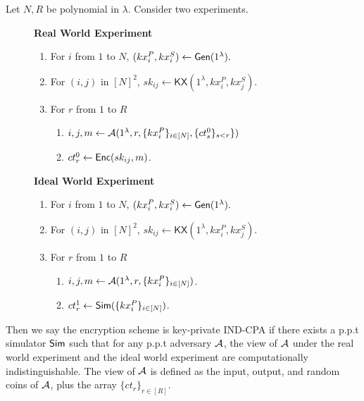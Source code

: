 \begin{definition}
Let $N, R$ be polynomial in $\lambda$. Consider two experiments.
\begin{figure}[h!]
\begin{framed}
\textbf{Real World Experiment}
\begin{enumerate}
    \item For $i$ from $1$ to $N$, $(kx_i^P, kx_i^S) \leftarrow \mathsf{Gen}(1^{\lambda}).$
    \item For $(i, j)$ in $[N]^2$, $sk_{ij} \leftarrow \mathsf{KX}(1^{\lambda}, kx_i^P, kx_j^S)$.
    \item For $r$ from $1$ to $R$
    \begin{enumerate}
        \item $i, j, m \leftarrow \mathcal{A}(1^{\lambda}, r, \{kx_i^P\}_{i \in [N]}, \{ct_{s}^0\}_{s < r}\})$
        \item $ct^{0}_r \leftarrow \mathsf{Enc}(sk_{ij}, m)$.
    \end{enumerate}
\end{enumerate}
\textbf{Ideal World Experiment}
\begin{enumerate}
    \item For $i$ from $1$ to $N$, $(kx_i^P, kx_i^S) \leftarrow \mathsf{Gen}(1^{\lambda}).$
    \item For $(i, j)$ in $[N]^2$, $sk_{ij} \leftarrow \mathsf{KX}(1^{\lambda}, kx_i^P, kx_j^S)$.
    \item For $r$ from $1$ to $R$
    \begin{enumerate}
        \item $i, j, m \leftarrow \mathcal{A}(1^{\lambda}, r, \{kx_i^P\}_{i \in [N]})$.
        \item $ct^1_r \leftarrow \mathsf{Sim}(\{kx_i^P\}_{i \in [N]})$.
    \end{enumerate}
\end{enumerate}
\end{framed}
\end{figure}
Then we say the encryption scheme is key-private IND-CPA if there exists a p.p.t simulator $\mathsf{Sim}$ such that for any p.p.t adversary $\mathcal{A}$, the view of $\mathcal{A}$ under the real world experiment and the ideal world experiment are computationally indistinguishable. The view of $\mathcal{A}$ is defined as the input, output, and random coins of $\mathcal{A}$, plus the array $\{ct_r\}_{r \in [R]}$.
\end{definition}

